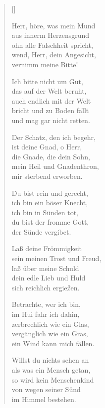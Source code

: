 \begin{multicols}{2}
\settowidth{\versewidth}{Herr, höre, was mein Mund }
\begin{verse}[\versewidth]


 Herr, höre, was mein Mund\\
aus innerm Herzensgrund\\
ohn alle Falschheit spricht,\\
wend, Herr, dein Angesicht,\\
vernimm meine Bitte!

 Ich bitte nicht um Gut,\\
das auf der Welt beruht,\\
auch endlich mit der Welt\\
bricht und zu Boden fällt\\
und mag gar nicht retten.

 Der Schatz, den ich begehr,\\
ist deine Gnad, o Herr,\\
die Gnade, die dein Sohn,\\
mein Heil und Gnadenthron,\\
mir sterbend erworben.

 Du bist rein und gerecht,\\
ich bin ein böser Knecht,\\
ich bin in Sünden tot,\\
du bist der fromme Gott,\\
der Sünde vergibet.

 Laß deine Frömmigkeit\\
sein meinen Trost und Freud,\\
laß über meine Schuld\\
dein edle Lieb und Huld\\
sich reichlich ergießen.

 Betrachte, wer ich bin,\\
im Hui fahr ich dahin,\\
zerbrechlich wie ein Glas,\\
vergänglich wie ein Gras,\\
ein Wind kann mich fällen.

 Willst du nichts sehen an\\
als was ein Mensch getan,\\
so wird kein Menschenkind\\
von wegen seiner Sünd\\
im Himmel bestehen.


\end{verse}
\end{multicols}
